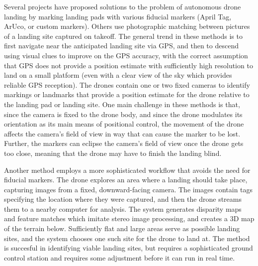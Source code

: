 Several projects have proposed solutions to the problem of autonomous drone landing by
marking landing pads with various fiducial markers (April Tag, ArUco, or custom markers).\cite{high_velocity_landing}\cite{visual_servoing}\cite{vision_based_x_platform}\cite{wynn}\cite{accurate_landing_UAV_ground_pattern}
Others use photographic matching between pictures of a landing site captured on takeoff.\cite{drone_landing_unstructured_environments}
The general trend in these methods is to first navigate near the anticipated landing site via GPS, and then to descend using visual clues to improve on the GPS accuracy,
with the correct assumption that GPS does not provide a position estimate with sufficiently high resolution to land on a small platform
(even with a clear view of the sky which provides reliable GPS reception).
The drones contain one or two fixed cameras to identify markings or landmarks that provide a position estimate for the drone relative to the landing pad or landing site.
One main challenge in these methods is that,
since the camera is fixed to the drone body,
and since the drone modulates its orientation as its main means of positional control,
the movement of the drone affects the camera's field of view in way that can cause the marker to be lost.
Further, the markers can eclipse the camera's field of view once the drone gets too close, meaning that the drone may have to finish the landing blind.

Another method employs a more sophisticated workflow that avoids the need for fiducial markers.\cite{rooftop_landing}
The drone explores an area where a landing should take place, capturing images from a fixed, downward-facing camera.
The images contain tags specifying the location where they were captured, and then the drone streams them to a nearby
computer for analysis.
The system generates disparity maps and feature matches which imitate stereo image processing, and creates a 3D map of the terrain below.
Sufficiently flat and large areas serve as possible landing sites, and the system chooses one such site for the drone to land at.
The method is succesful in identifying viable landing sites, but requires a sophisticated ground control station and requires some adjustment before it can run in real time.